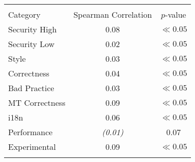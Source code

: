 
\begin{tabular}{lcc}
\hline \\
Category & Spearman Correlation & $p$-value \\ \hline 
Security High & 0.08 & $\ll 0.05$\\
Security Low & 0.02 & $\ll 0.05$\\
Style & 0.03 & $\ll 0.05$\\
Correctness & 0.04 & $\ll 0.05$\\
Bad Practice & 0.03 & $\ll 0.05$\\
MT Correctness & 0.09 & $\ll 0.05$\\
i18n & 0.06 & $\ll 0.05$\\
Performance & {\it (0.01) } & 0.07\\
Experimental & 0.09 & $\ll 0.05$\\
\hline \\
\end{tabular}
